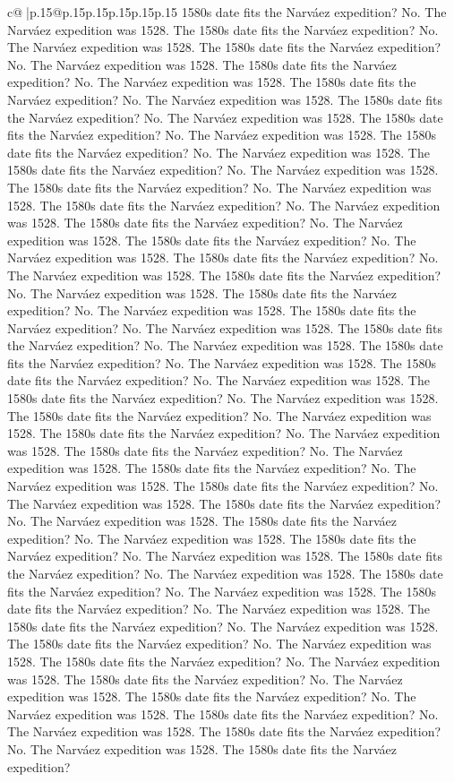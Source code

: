 \documentclass{article}
\begin{document}
{\begin{supertabular}{c@{$\;$}|p{.15\linewidth}@{}p{.15\linewidth}p{.15\linewidth}p{.15\linewidth}p{.15\linewidth}p{.15\linewidth}}
{{{1580s date fits the Narváez expedition? No. The Narváez expedition was 1528. The 1580s date fits the Narváez expedition? No. The Narváez expedition was 1528. The 1580s date fits the Narváez expedition? No. The Narváez expedition was 1528. The 1580s date fits the Narváez expedition? No. The Narváez expedition was 1528. The 1580s date fits the Narváez expedition? No. The Narváez expedition was 1528. The 1580s date fits the Narváez expedition? No. The Narváez expedition was 1528. The 1580s date fits the Narváez expedition? No. The Narváez expedition was 1528. The 1580s date fits the Narváez expedition? No. The Narváez expedition was 1528. The 1580s date fits the Narváez expedition? No. The Narváez expedition was 1528. The 1580s date fits the Narváez expedition? No. The Narváez expedition was 1528. The 1580s date fits the Narváez expedition? No. The Narváez expedition was 1528. The 1580s date fits the Narváez expedition? No. The Narváez expedition was 1528. The 1580s date fits the Narváez expedition? No. The Narváez expedition was 1528. The 1580s date fits the Narváez expedition? No. The Narváez expedition was 1528. The 1580s date fits the Narváez expedition? No. The Narváez expedition was 1528. The 1580s date fits the Narváez expedition? No. The Narváez expedition was 1528. The 1580s date fits the Narváez expedition? No. The Narváez expedition was 1528. The 1580s date fits the Narváez expedition? No. The Narváez expedition was 1528. The 1580s date fits the Narváez expedition? No. The Narváez expedition was 1528. The 1580s date fits the Narváez expedition? No. The Narváez expedition was 1528. The 1580s date fits the Narváez expedition? No. The Narváez expedition was 1528. The 1580s date fits the Narváez expedition? No. The Narváez expedition was 1528. The 1580s date fits the Narváez expedition? No. The Narváez expedition was 1528. The 1580s date fits the Narváez expedition? No. The Narváez expedition was 1528. The 1580s date fits the Narváez expedition? No. The Narváez expedition was 1528. The 1580s date fits the Narváez expedition? No. The Narváez expedition was 1528. The 1580s date fits the Narváez expedition? No. The Narváez expedition was 1528. The 1580s date fits the Narváez expedition? No. The Narváez expedition was 1528. The 1580s date fits the Narváez expedition? No. The Narváez expedition was 1528. The 1580s date fits the Narváez expedition? No. The Narváez expedition was 1528. The 1580s date fits the Narváez expedition? No. The Narváez expedition was 1528. The 1580s date fits the Narváez expedition? No. The Narváez expedition was 1528. The 1580s date fits the Narváez expedition? No. The Narváez expedition was 1528. The 1580s date fits the Narváez expedition? No. The Narváez expedition was 1528. The 1580s date fits the Narváez expedition? No. The Narváez expedition was 1528. The 1580s date fits the Narváez expedition? No. The Narváez expedition was 1528. The 1580s date fits the Narváez expedition? No. The Narváez expedition was 1528. The 1580s date fits the Narváez expedition? No. The Narváez expedition was 1528. The 1580s date fits the Narváez expedition? No. The Narváez expedition was 1528. The 1580s date fits the Narváez expedition? }}}
\end{supertabular}}
\end{document}
